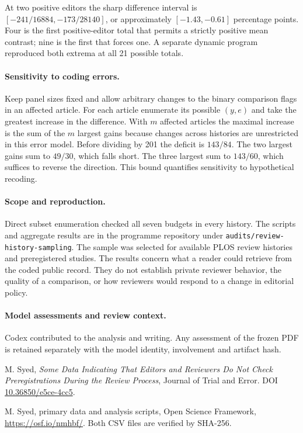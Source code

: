 \documentclass[11pt]{article}
\begin{document}
At two positive editors the sharp difference interval is $[-241/16884,-173/28140]$, or approximately $[-1.43,-0.61]$ percentage points. Four is the first positive-editor total that permits a strictly positive mean contrast; nine is the first that forces one. A separate dynamic program reproduced both extrema at all 21 possible totals.

\paragraph{Sensitivity to coding errors.} Keep panel sizes fixed and allow arbitrary changes to the binary comparison flags in an affected article. For each article enumerate its possible $(y,e)$ and take the greatest increase in the difference. With $m$ affected articles the maximal increase is the sum of the $m$ largest gains because changes across histories are unrestricted in this error model. Before dividing by 201 the deficit is $143/84$. The two largest gains sum to $49/30$, which falls short. The three largest sum to $143/60$, which suffices to reverse the direction. This bound quantifies sensitivity to hypothetical recoding.

\paragraph{Scope and reproduction.} Direct subset enumeration checked all seven budgets in every history. The scripts and aggregate results are in the programme repository under \texttt{audits/review-history-sampling}. The sample was selected for available PLOS review histories and preregistered studies. The results concern what a reader could retrieve from the coded public record. They do not establish private reviewer behavior, the quality of a comparison, or how reviewers would respond to a change in editorial policy.

\paragraph{Model assessments and review context.} Codex contributed to the analysis and writing. Any assessment of the frozen PDF is retained separately with the model identity, involvement and artifact hash.
\par\small\noindent [1] M. Syed, \emph{Some Data Indicating That Editors and Reviewers Do Not Check Preregistrations During the Review Process}, Journal of Trial and Error. DOI \url{10.36850/e5ce-4cc5}.
\par\noindent [2] M. Syed, primary data and analysis scripts, Open Science Framework, \url{https://osf.io/nmhbf/}. Both CSV files are verified by SHA-256.
\end{document}
